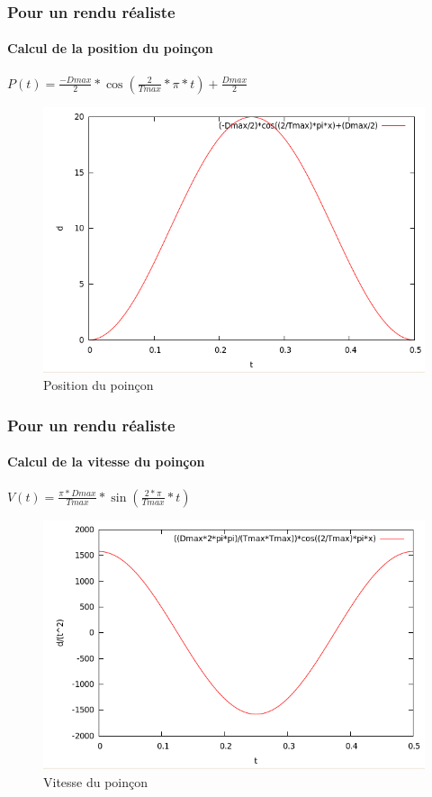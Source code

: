 \documentclass{beamer}
\begin{document}
\begin{frame}
    \frametitle{Pour un rendu réaliste}
    \framesubtitle{Calcul de la position du poinçon}
    \begin{center}
        $P(t) = \frac{-Dmax}{2}*\cos(\frac{2}{Tmax}*\pi*t)+\frac{Dmax}{2}$
    \end{center}
        \begin{figure}
            \includegraphics[width=.7\textwidth]{img/position.png}
            \caption{Position du poinçon}
            \label{Position}
        \end{figure}
\end{frame}
\begin{frame}
    \frametitle{Pour un rendu réaliste}
    \framesubtitle{Calcul de la vitesse du poinçon}
    \begin{center}
        $V(t) = \frac{\pi*Dmax}{Tmax}*\sin(\frac{2*\pi}{Tmax}*t)$
    \end{center}
    \begin{figure}
        \includegraphics[width=.7\textwidth]{img/acceleration.png}
        \caption{Vitesse du poinçon}
        \label{Vitesse}
    \end{figure}
\end{frame}
\end{document}
